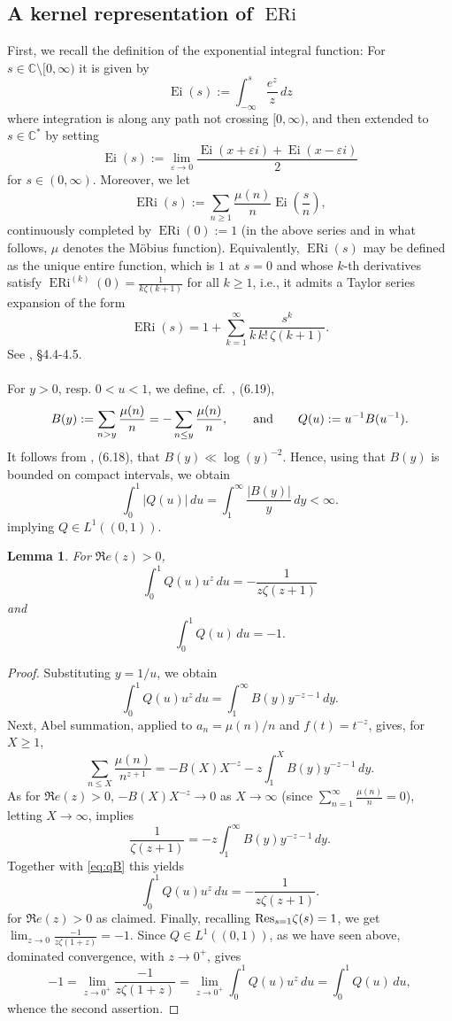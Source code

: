 \documentclass[a4paper,10pt]{amsart}
\DeclareMathOperator{\Ei}{Ei}
\DeclareMathOperator{\ERi}{ERi}
\newcommand{\C}{\mathbb C}
\newtheorem{lemma}[equation]{Lemma}
\theoremstyle{definition}
\numberwithin{equation}{section}
\def\C{\mathbb C}
\begin{document}
\subsection{A kernel representation of \texorpdfstring{$\ERi$}{ERi}} 
First, we recall the definition of the exponential integral function: For $s\in\C\setminus [0,\infty)$ it is given by
$$\Ei(s):=\int_{-\infty}^s \frac{e^z}{z}\,dz$$
where integration is along any path not crossing $[0,\infty)$, and then extended to $s\in\C^*$ by setting
$$\Ei(s):=\lim_{\varepsilon\to 0}\frac{\Ei(x+\varepsilon i)+\Ei(x-\varepsilon i)}{2}$$
for $s\in (0,\infty)$. Moreover, we let
$$\ERi(s):=\sum_{n\geq 1} \frac{\mu(n)}{n} \Ei\left(\frac{s}{n}\right),$$ 
continuously completed by $\ERi(0):=1$ (in the above series and in what follows, $\mu$ denotes the M\"obius function). Equivalently, $\ERi(s)$ may be defined as the unique entire function, which is $1$ at $s=0$ and whose $k$-th derivatives satisfy $\ERi^{(k)}(0)=\frac{1}{k \zeta(k+1)}$ for all $k\geq 1$, i.e., it admits a Taylor series expansion of the form
\begin{equation}\label{eq:ERI}
\ERi(s)=1+\sum_{k=1}^{\infty}
\frac{s^k}{k\,k!\,\zeta(k+1)}.
\end{equation}
See \cite{Elliott2025}, \S 4.4-4.5.\\\\
For $y>0$, resp. $0<u<1$, we define, cf.\ \cite{MontgomeryVaughan}, (6.19),
$$
B(y):=\sum_{n>y}\frac{\mu(n)}{n}=-\sum_{n\le y}\frac{\mu(n)}{n}, \qquad {\rm and }\qquad Q(u):=u^{-1}B(u^{-1}).
$$
It follows from \cite{MontgomeryVaughan}, (6.18), that $B(y)\ll \log(y)^{-2}$. Hence, using that $B(y)$ is bounded on compact intervals, we obtain
$$
\int_0^1 |Q(u)|\,du = \int_1^\infty \frac{|B(y)|}{y}\,dy <\infty.
$$
implying $Q\in L^1((0,1))$. 

\begin{lemma}\label{lem:MellinQ}
For $\Re e(z)>0$,
$$
\int_0^1Q(u)u^z\,du=-\frac1{z\zeta(z+1)}
$$
and
$$
\int_0^1Q(u)\,du=-1.
$$
\end{lemma}

\begin{proof}
Substituting $y=1/u$, we obtain
\begin{equation}\label{eq:qB}
\int_0^1Q(u)u^z\,du = \int_1^\infty B(y)y^{-z-1}\,dy.
\end{equation}
Next, Abel summation, applied to
$a_n=\mu(n)/n$ and $f(t)=t^{-z}$, gives, for $X\ge1$,
$$
\sum_{n\le X}\frac{\mu(n)}{n^{z+1}} = -B(X)X^{-z} - z\int_1^X B(y)y^{-z-1}\,dy.
$$
As for $\Re e(z)>0$, $-B(X)X^{-z}\rightarrow0$ as $X\to\infty$ (since $\sum_{n=1}^{\infty}\frac{\mu(n)}{n}=0$), letting $X\to\infty$, implies
$$
\frac1{\zeta(z+1)} = -z\int_1^\infty B(y)y^{-z-1}\,dy.
$$
Together with \eqref{eq:qB} this yields
$$
\int_0^1Q(u)u^z\,du = -\frac1{z\zeta(z+1)}.
$$
for $\Re e(z)>0$ as claimed. Finally, recalling ${\rm Res}_{s=1}\zeta(s)=1$, we get $\lim_{z\to 0} \frac{-1}{z\zeta(1+z)}=-1$. Since $Q\in L^1((0,1))$, as we have seen above, dominated convergence, with $z\to0^+$, gives
$$-1=\lim_{z\to 0^+} \frac{-1}{z\zeta(1+z)}=\lim_{z\to 0^+}\int_0^1Q(u)u^z\,du%
=\int_0^1Q(u)\,du,$$ 
whence the second assertion.
\end{proof}
\end{document}
